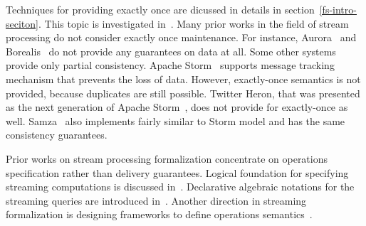 
\label {fs-related-seciton}

Techniques for providing exactly once are dicussed   in details in section~\ref{fs-intro-seciton}. 
This topic is investigated in~\cite{Carbone:2017:SMA:3137765.3137777, Akidau:2013:MFS:2536222.2536229, Zaharia:2012:DSE:2342763.2342773}. Many prior works in the field of stream processing do not consider exactly once maintenance. 
For instance, Aurora~\cite{Abadi:2003:ANM:950481.950485} and Borealis~\cite{abadi2005design} do not provide any guarantees on data at all. Some other systems provide only partial consistency. Apache Storm~\cite{apache:storm} supports message tracking mechanism that prevents the loss of data. 
However, exactly-once semantics is not provided, because duplicates are still possible. Twitter Heron, that was presented as the next generation of Apache Storm~\cite{Kulkarni:2015:THS:2723372.2742788}, does not provide for exactly-once as well. 
Samza~\cite{Noghabi:2017:SSS:3137765.3137770} also implements fairly similar to Storm model and has the same consistency guarantees.

Prior works on stream processing formalization concentrate on operations specification rather than delivery guarantees. Logical foundation for specifying streaming computations is discussed in~\cite{alur2018interfaces}. Declarative algebraic notations for the streaming queries are introduced in~\cite{halle2014formalization}. Another direction in streaming formalization is designing frameworks to define operations semantics~\cite{beck2018lars}.